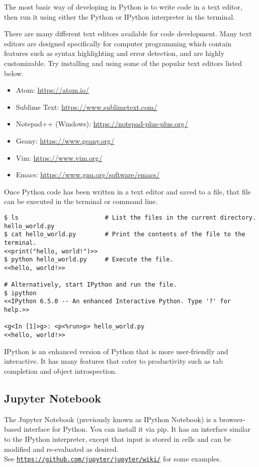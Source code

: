 The most basic way of developing in Python is to write code in a text editor, then run it using either the Python or IPython interpreter in the terminal.

There are many different text editors available for code development. Many text editors are designed specifically for computer programming which contain features such as syntax highlighting and error detection, and are highly customizable.
Try installing and using some of the popular text editors listed below.
\begin{itemize}
\item Atom: \url{https://atom.io/}
\item Sublime Text: \url{https://www.sublimetext.com/}
\item Notepad++ (Windows): \url{https://notepad-plus-plus.org/}
\item Geany: \url{https://www.geany.org/}
\item Vim: \url{https://www.vim.org/}
\item Emacs: \url{https://www.gnu.org/software/emacs/}
\end{itemize}

Once Python code has been written in a text editor and saved to a file, that file can be executed in the terminal or command line.
\begin{lstlisting}
$ ls                        # List the files in the current directory.
hello_world.py
$ cat hello_world.py        # Print the contents of the file to the terminal.
<<print("hello, world!")>>
$ python hello_world.py     # Execute the file.
<<hello, world!>>

# Alternatively, start IPython and run the file.
$ ipython
<<IPython 6.5.0 -- An enhanced Interactive Python. Type '?' for help.>>

<g<In [1]>g>: <p<%run>p> hello_world.py
<<hello, world!>>
\end{lstlisting}

IPython is an enhanced version of Python that is more user-friendly and interactive.
It has many features that cater to productivity such as tab completion and object introspection.

\subsection*{Jupyter Notebook} %

The Jupyter Notebook (previously known as IPython Notebook) is a
browser-based interface for Python. You can install it via pip.
It has an interface similar to the IPython interpreter, except that input is stored in cells and can be modified and re-evaluated as desired.\\
See \href{https://github.com/jupyter/jupyter/wiki/A-gallery-of-interesting-Jupyter-Notebooks}{\texttt{https://github.com/jupyter/jupyter/wiki/}}
for some examples.

